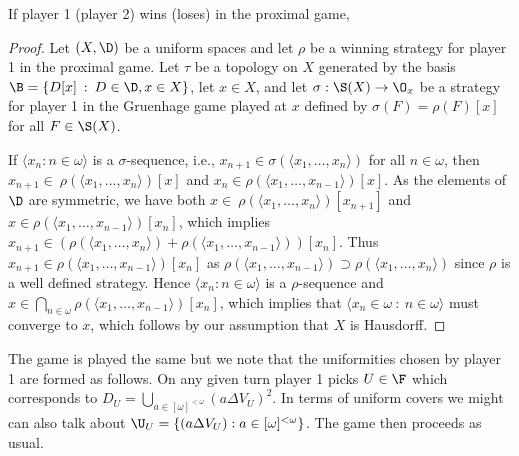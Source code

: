 \documentclass{article}
\begin{document}
\begin{prop}
    If player 1 (player 2) wins (loses) in the proximal game, %
\end{prop}
\begin{proof}
    Let \((X, \D)\) be a uniform spaces and let \(\rho\) be a winning strategy for player 1 in the proximal game. Let \(\tau\) be a topology on \(X\) generated by the basis \(\B = \{D[x] \: : \: D \in \D, x \in X\}\), let \(x \in X\), and let \(\sigma: \S(X) \to \O_x\) be a strategy for player 1 in the Gruenhage game played at \(x\) defined by \(\sigma(F) = \rho(F)[x]\) for all \(F \in \S(X)\). 
    
    If \(\langle x_n : n \in \omega \rangle\) is a \(\sigma\)-sequence, i.e., \(x_{n +1} \in \sigma\left(\langle x_1, \dots, x_n\rangle\right)\) for all \(n \in \omega\), then \(x_{n +1} \in \ \rho\left(\langle x_1, \dots, x_n\rangle\right)[x]\) and \(x_n \in \rho\left(\langle x_1, \dots, x_{n - 1}\rangle\right)[x]\).
    As the elements of \(\D\) are symmetric, we have both \(x \in \ \rho\left(\langle x_1, \dots, x_n\rangle\right)[x_{n + 1}]\) and \(x \in \rho\left(\langle x_1, \dots, x_{n - 1}\rangle\right)[x_n]\), which implies \(x_{n + 1} \in \left(\rho\left(\langle x_1, \dots, x_n\rangle\right) +  \rho\left(\langle x_1, \dots, x_{n - 1}\rangle\right)\right)[x_n]\). Thus \(x_{n + 1} \in \rho\left(\langle x_1, \dots, x_{n - 1}\rangle\right)[x_n]\) as \(\rho\left(\langle x_1, \dots, x_{n - 1}\rangle\right) \supset \rho\left(\langle x_1, \dots, x_n\rangle\right)\) since \(\rho\) is a well defined strategy. Hence \(\langle x_n : n \in \omega \rangle\) is a \(\rho\)-sequence and \(x \in \bigcap_{n \in \omega}\rho\left(\langle x_1, \dots, x_{n - 1}\rangle\right)[x_n]\), which implies that \(\langle x_n \in \omega \: : \: n \in \omega\rangle\) must converge to \(x\), which follows by our assumption that \(X\) is Hausdorff.
\end{proof}

\begin{rem}
    The game is played the same but we note that the uniformities chosen by player 1 are formed as follows. On any given turn player 1 picks \(U \in \F\) which corresponds to \(D_U = \bigcup_{a \in [\omega]^{<\omega}}\left(a\Delta V_U\right)^2\). In terms of uniform covers we might can also talk about \(\U_U = \{(a\Delta V_U):a \in [\omega]^{<\omega}\}\). The game then proceeds as usual.
\end{rem}
\end{document}
